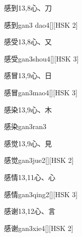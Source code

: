\begin{entry}{感到}{13,8}{⼼、⼑}
  \begin{phonetics}{感到}{gan3 dao4}[][HSK 2]
  \end{phonetics}
\end{entry}

\begin{entry}{感受}{13,8}{⼼、⼜}
  \begin{phonetics}{感受}{gan3shou4}[][HSK 3]
  \end{phonetics}
\end{entry}

\begin{entry}{感冒}{13,9}{⼼、⽇}
  \begin{phonetics}{感冒}{gan3mao4}[][HSK 3]
  \end{phonetics}
\end{entry}

\begin{entry}{感染}{13,9}{⼼、⽊}
  \begin{phonetics}{感染}{gan3ran3}
  \end{phonetics}
\end{entry}

\begin{entry}{感觉}{13,9}{⼼、⾒}
  \begin{phonetics}{感觉}{gan3jue2}[][HSK 2]
  \end{phonetics}
\end{entry}

\begin{entry}{感情}{13,11}{⼼、⼼}
  \begin{phonetics}{感情}{gan3qing2}[][HSK 3]
  \end{phonetics}
\end{entry}

\begin{entry}{感谢}{13,12}{⼼、⾔}
  \begin{phonetics}{感谢}{gan3xie4}[][HSK 2]
  \end{phonetics}
\end{entry}

